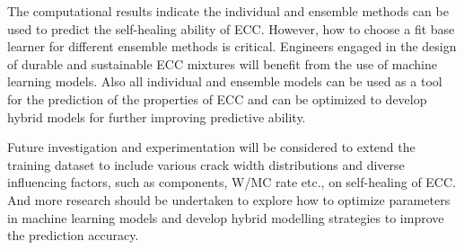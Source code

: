 \documentclass[11pt]{article}
\begin{document}
	The computational results indicate the individual and ensemble methods can be used to predict the self-healing ability of ECC. However, how to choose a fit base learner for different ensemble methods is critical. Engineers engaged in the design of durable and sustainable ECC mixtures will benefit from the use of machine learning models. Also all individual and ensemble models can be used as a tool for the prediction of the properties of ECC and can be optimized to develop hybrid models for further improving predictive ability.
	
	Future investigation and experimentation will be considered to extend the training dataset to include various crack width distributions and diverse influencing factors, such as components, W/MC rate etc., on self-healing of ECC. And more research should be undertaken to explore how to optimize parameters in machine learning models and develop hybrid modelling strategies to improve the prediction accuracy.	
	
	
	
	
	
\end{document}
